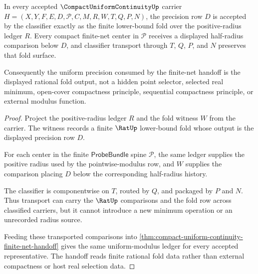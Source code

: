 \begin{theorem}
\label{thm:compact-uniform-continuity-radius-fold-exactness}
In every accepted $\CompactUniformContinuityUp$ carrier
$H=(X,Y,F,E,D,\mathcal{P},C,M,R,W,T,Q,P,N)$, the precision row $D$ is accepted
by the classifier exactly as the finite lower-bound fold over the
positive-radius ledger $R$. Every compact finite-net center in
$\mathcal{P}$ receives a displayed half-radius comparison below $D$, and
classifier transport through $T$, $Q$, $P$, and $N$ preserves that fold
surface.

Consequently the uniform precision consumed by the finite-net handoff is the
displayed rational fold output, not a hidden point selector, selected real
minimum, open-cover compactness principle, sequential compactness principle,
or external modulus function.
\end{theorem}
\begin{proof}
Project the positive-radius ledger $R$ and the fold witness $W$ from the
carrier. The witness records a finite $\RatUp$ lower-bound fold whose output
is the displayed precision row $D$.

For each center in the finite $\mathsf{ProbeBundle}$ spine $\mathcal{P}$, the
same ledger supplies the positive radius used by the pointwise-modulus row,
and $W$ supplies the comparison placing $D$ below the corresponding
half-radius history.

The classifier is componentwise on $T$, routed by $Q$, and packaged by $P$ and
$N$. Thus transport can carry the $\RatUp$ comparisons and the fold row across
classified carriers, but it cannot introduce a new minimum operation or an
unrecorded radius source.

Feeding these transported comparisons into
\autoref{thm:compact-uniform-continuity-finite-net-handoff} gives the same
uniform-modulus ledger for every accepted representative. The handoff reads
finite rational fold data rather than external compactness or host real
selection data.
\end{proof}

